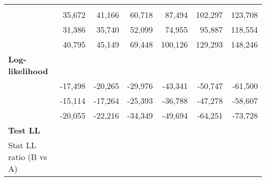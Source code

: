 \begin{tabular}{lllllll}
  \multicolumn{1}{|r}{} &
  \multicolumn{1}{r}{} &
  \multicolumn{1}{r}{} &
  \multicolumn{1}{r}{} &
  \multicolumn{1}{r}{} &
  \multicolumn{1}{r}{} \\
\multicolumn{1}{l}{\hspace{1em}{Model (A)}} &
  \multicolumn{1}{|r}{35,672} &
  \multicolumn{1}{r}{41,166} &
  \multicolumn{1}{r}{60,718} &
  \multicolumn{1}{r}{87,494} &
  \multicolumn{1}{r}{102,297} &
  \multicolumn{1}{r}{123,708} \\
\multicolumn{1}{l}{\hspace{1em}{Model (B)}} &
  \multicolumn{1}{|r}{31,386} &
  \multicolumn{1}{r}{35,740} &
  \multicolumn{1}{r}{52,099} &
  \multicolumn{1}{r}{74,955} &
  \multicolumn{1}{r}{95,887} &
  \multicolumn{1}{r}{118,554} \\
\multicolumn{1}{l}{\hspace{1em}{Model (C)}} &
  \multicolumn{1}{|r}{40,795} &
  \multicolumn{1}{r}{45,149} &
  \multicolumn{1}{r}{69,448} &
  \multicolumn{1}{r}{100,126} &
  \multicolumn{1}{r}{129,293} &
  \multicolumn{1}{r}{148,246} \\
\multicolumn{1}{l}{\textbf{Log-likelihood}} &
  \multicolumn{1}{|r}{} &
  \multicolumn{1}{r}{} &
  \multicolumn{1}{r}{} &
  \multicolumn{1}{r}{} &
  \multicolumn{1}{r}{} &
  \multicolumn{1}{r}{} \\
\multicolumn{1}{l}{\hspace{1em}{Model (A)}} &
  \multicolumn{1}{|r}{-17,498} &
  \multicolumn{1}{r}{-20,265} &
  \multicolumn{1}{r}{-29,976} &
  \multicolumn{1}{r}{-43,341} &
  \multicolumn{1}{r}{-50,747} &
  \multicolumn{1}{r}{-61,500} \\
\multicolumn{1}{l}{\hspace{1em}{Model (B)}} &
  \multicolumn{1}{|r}{-15,114} &
  \multicolumn{1}{r}{-17,264} &
  \multicolumn{1}{r}{-25,393} &
  \multicolumn{1}{r}{-36,788} &
  \multicolumn{1}{r}{-47,278} &
  \multicolumn{1}{r}{-58,607} \\
\multicolumn{1}{l}{\hspace{1em}{Model (C)}} &
  \multicolumn{1}{|r}{-20,055} &
  \multicolumn{1}{r}{-22,216} &
  \multicolumn{1}{r}{-34,349} &
  \multicolumn{1}{r}{-49,694} &
  \multicolumn{1}{r}{-64,251} &
  \multicolumn{1}{r}{-73,728} \\
\multicolumn{1}{l}{\textbf{Test LL}} &
  \multicolumn{1}{|r}{} &
  \multicolumn{1}{r}{} &
  \multicolumn{1}{r}{} &
  \multicolumn{1}{r}{} &
  \multicolumn{1}{r}{} &
  \multicolumn{1}{r}{} \\
\multicolumn{1}{l}{\hspace{1em}Stat LL ratio (B vs A)} &

\end{tabular}
